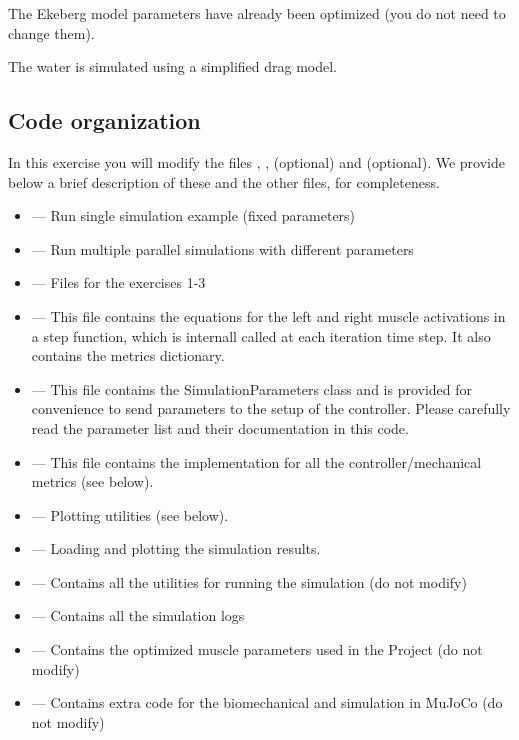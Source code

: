 \documentclass{cmc}
\begin{document}
The Ekeberg model parameters have already been optimized (you do not need to change them).

The water is simulated using a simplified drag model.


\subsection*{Code organization}\label{subsec:code}

In this exercise you will modify the files , ,  (optional) and  (optional). We provide below
a brief description of these and the other files, for completeness.

\begin{itemize}
\item {} --- Run single simulation example (fixed parameters)
\item {} --- Run multiple parallel simulations with different parameters
\item {} --- Files for the exercises 1-3
\item {} --- This file contains the equations for the left and right muscle activations in a step function, which is internall called at each iteration time step. It also contains the metrics dictionary.
\item {} --- This file contains the
  SimulationParameters class and is provided for convenience to send parameters
  to the setup of the controller. Please carefully read the parameter list
  and their documentation in this code.
\item {} --- This file contains the implementation
  for all the controller/mechanical metrics (see below).
\item {} --- Plotting utilities (see below).
\item {} --- Loading and plotting the simulation results.
\item {} --- Contains all the utilities for running the simulation (do not modify)	
\item {} --- Contains all the simulation logs
\item {} --- Contains the optimized muscle parameters used in the Project (do not modify)
\item {} --- Contains extra code for the biomechanical and simulation in MuJoCo (do not modify)
\end{itemize}
\end{document}
